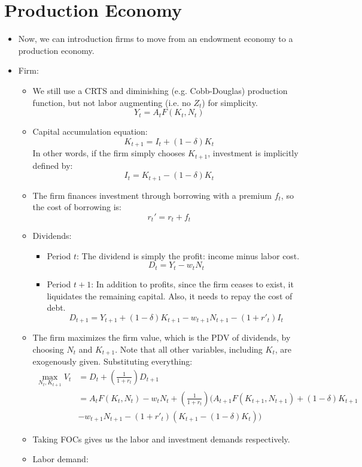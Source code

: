 \documentclass[notitlepage]{article}
\begin{document}
\section{Production Economy}

\begin{itemize}
\item Now, we can introduction firms to move from an endowment economy to a production economy.
\item Firm:
\begin{itemize}
\item We still use a CRTS and diminishing (e.g. Cobb-Douglas) production function, but not labor augmenting (i.e. no $Z_t$) for simplicity.
\[
Y_t = A_t F(K_t, N_t)
\]
\item Capital accumulation equation:
\[
K_{t+1} = I_t + (1-\delta)K_t 
\]
In other words, if the firm simply chooses $K_{t+1}$, investment is implicitly defined by:
\[
I_t = K_{t+1} - (1-\delta)K_t 
\]
\item The firm finances investment through borrowing with a premium $f_t$, so the cost of borrowing is:
\[
r_t' = r_t + f_t
\]
\item Dividends:
\begin{itemize}
\item Period $t$: The dividend is simply the profit: income minus labor cost.
\[
D_t = Y_t - w_tN_t
\]
\item Period $t+1$: In addition to profits, since the firm ceases to exist, it liquidates the remaining capital. Also, it needs to repay the cost of debt.
\[
D_{t+1} = Y_{t+1} + (1-\delta)K_{t+1} - w_{t+1}N_{t+1} - (1+r'_t)I_t
\]
\end{itemize}
\item The firm maximizes the firm value, which is the PDV of dividends, by choosing $N_t$ and $K_{t+1}$. Note that all other variables, including $K_t$, are exogenously given. Substituting everything:
\begin{align*}
\max_{N_t, K_{t+1}} V_t 
&= D_t + \left(\frac{1}{1+r_t}\right)D_{t+1} \\
&= A_t F(K_t, N_t) - w_tN_t +\left(\frac{1}{1+r_t}\right) (A_{t+1} F(K_{t+1}, N_{t+1}) + (1-\delta)K_{t+1} \\
&- w_{t+1}N_{t+1} - (1+r'_t)(K_{t+1} - (1-\delta)K_t ))
\end{align*}
\item Taking FOCs gives us the labor and investment demands respectively.
\item Labor demand:
\begin{align*}

\end{align*}
\end{itemize}
\end{itemize}
\end{document}
